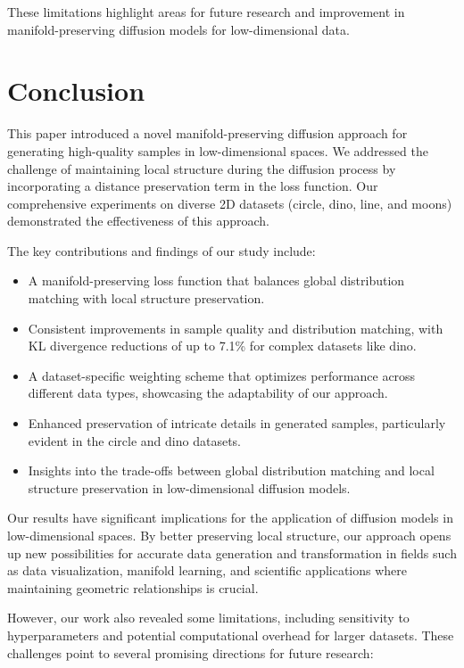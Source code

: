 \documentclass{article} %
\begin{document}
These limitations highlight areas for future research and improvement in manifold-preserving diffusion models for low-dimensional data.

\section{Conclusion}
\label{sec:conclusion}

This paper introduced a novel manifold-preserving diffusion approach for generating high-quality samples in low-dimensional spaces. We addressed the challenge of maintaining local structure during the diffusion process by incorporating a distance preservation term in the loss function. Our comprehensive experiments on diverse 2D datasets (circle, dino, line, and moons) demonstrated the effectiveness of this approach.

The key contributions and findings of our study include:

\begin{itemize}
    \item A manifold-preserving loss function that balances global distribution matching with local structure preservation.
    \item Consistent improvements in sample quality and distribution matching, with KL divergence reductions of up to 7.1\% for complex datasets like dino.
    \item A dataset-specific weighting scheme that optimizes performance across different data types, showcasing the adaptability of our approach.
    \item Enhanced preservation of intricate details in generated samples, particularly evident in the circle and dino datasets.
    \item Insights into the trade-offs between global distribution matching and local structure preservation in low-dimensional diffusion models.
\end{itemize}

Our results have significant implications for the application of diffusion models in low-dimensional spaces. By better preserving local structure, our approach opens up new possibilities for accurate data generation and transformation in fields such as data visualization, manifold learning, and scientific applications where maintaining geometric relationships is crucial.

However, our work also revealed some limitations, including sensitivity to hyperparameters and potential computational overhead for larger datasets. These challenges point to several promising directions for future research:
\end{document}
